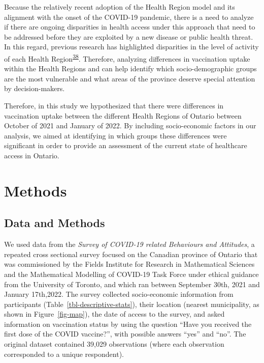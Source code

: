 \documentclass[
  letterpaper,
  DIV=11,
  numbers=noendperiod]{scrartcl}
\begin{document}
Because the relatively recent adoption of the Health Region model and
its alignment with the onset of the COVID-19 pandemic, there is a need
to analyze if there are ongoing disparities in health access under this
approach that need to be addressed before they are exploited by a new
disease or public health threat. In this regard, previous research has
highlighted disparities in the level of activity of each Health
Region\textsuperscript{\protect\hyperlink{ref-sethuram2023}{38}}.
Therefore, analyzing differences in vaccination uptake within the Health
Regions and can help identify which socio-demographic groups are the
most vulnerable and what areas of the province deserve special attention
by decision-makers.

Therefore, in this study we hypothesized that there were differences in
vaccination uptake between the different Health Regions of Ontario
between October of 2021 and January of 2022. By including socio-economic
factors in our analysis, we aimed at identifying in which groups these
differences were significant in order to provide an assessment of the
current state of healthcare access in Ontario.

\hypertarget{methods}{%
\section{Methods}\label{methods}}

\hypertarget{sec-data}{%
\subsection{Data and Methods}\label{sec-data}}

We used data from the \emph{Survey of COVID-19 related Behaviours and
Attitudes}, a repeated cross sectional survey focused on the Canadian
province of Ontario that was commissioned by the Fields Institute for
Research in Mathematical Sciences and the Mathematical Modelling of
COVID-19 Task Force under ethical guidance from the University of
Toronto, and which ran between September 30th, 2021 and January
17th,2022. The survey collected socio-economic information from
participants (Table~\ref{tbl-descriptive-stats}), their location
(nearest municipality, as shown in Figure~\ref{fig-map}), the date of
access to the survey, and asked information on vaccination status by
using the question ``Have you received the first dose of the COVID
vaccine?'', with possible answers ``yes'' and ``no''. The original
dataset contained 39,029 observations (where each observation
corresponded to a unique respondent).
\end{document}

